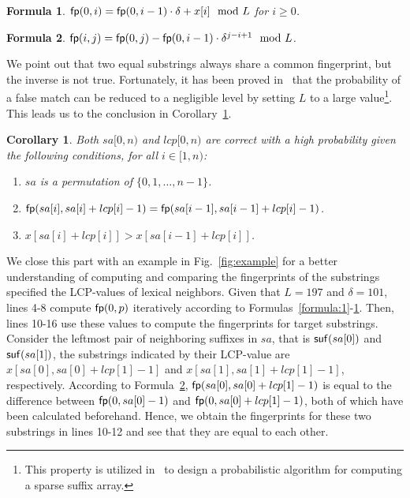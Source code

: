 \documentclass[10pt,journal,compsoc]{IEEEtran}
\newtheorem{Formula}{Formula}
\newtheorem{Corollary}{Corollary}
\begin{document}
\begin{Formula} \label{formula:2}	
	${\sf fp}(0, i) = {\sf fp}(0, i - 1) \cdot {\delta} + x[i]\mod L$ for $i \ge 0$.
	
\end{Formula}

\begin{Formula} \label{formula:3}
	${\sf fp}(i, j) = {\sf fp}(0, j) - {\sf fp}(0 ,i - 1) \cdot {\delta}^{j - i + 1}\mod L$.
	
\end{Formula}

We point out that two equal substrings always share a common fingerprint, but the inverse is not true. Fortunately, it has been proved in~\cite{Karp1987} that the probability of a false match can be reduced to a negligible level by setting $L$ to a large value\footnote{This property is utilized in~\cite{Bille2013} to design a probabilistic algorithm for computing a sparse suffix array. }. This leads us to the conclusion in Corollary~\ref{corollary:1}.

\begin{Corollary} \label{corollary:1}
	Both $sa[0, n)$ and $lcp[0, n)$ are correct with a high probability given the following conditions, for all $i \in [1, n)$:
	
	\begin{enumerate}[(1)]
		\item
		$sa$ is a permutation of $\{0, 1, \dots, n - 1\}$.
		
		\item
		${\sf fp}(sa[i], sa[i] + lcp[i] - 1) = {\sf fp}(sa[i - 1], sa[i - 1] + lcp[i] - 1)$.
		
		\item
		$x[sa[i] + lcp[i]] > x[sa[i - 1] + lcp[i]]$.
	\end{enumerate}
\end{Corollary}

We close this part with an example in Fig.~\ref{fig:example} for a better understanding of computing and comparing the fingerprints of the substrings specified the LCP-values of lexical neighbors. Given that $L = 197$ and $\delta = 101$, lines 4-8 compute ${\sf fp}(0, p)$ iteratively according to Formulas~\ref{formula:1}-\ref{formula:2}. Then, lines 10-16 use these values to compute the fingerprints for target substrings. Consider the leftmost pair of neighboring suffixes in $sa$, that is ${\sf suf}(sa[0])$ and ${\sf suf}(sa[1])$, the substrings indicated by their LCP-value are $x[sa[0], sa[0] + lcp[1] - 1]$ and $x[sa[1], sa[1] + lcp[1] - 1]$, respectively. According to Formula~\ref{formula:3}, ${\sf fp}(sa[0], sa[0] + lcp[1] - 1)$ is equal to the difference between ${\sf fp}(0, sa[0] - 1)$ and ${\sf fp}(0, sa[0] + lcp[1] - 1)$, both of which have been calculated beforehand. Hence, we obtain the fingerprints for these two substrings in lines 10-12 and see that they are equal to each other. 
\end{document}
